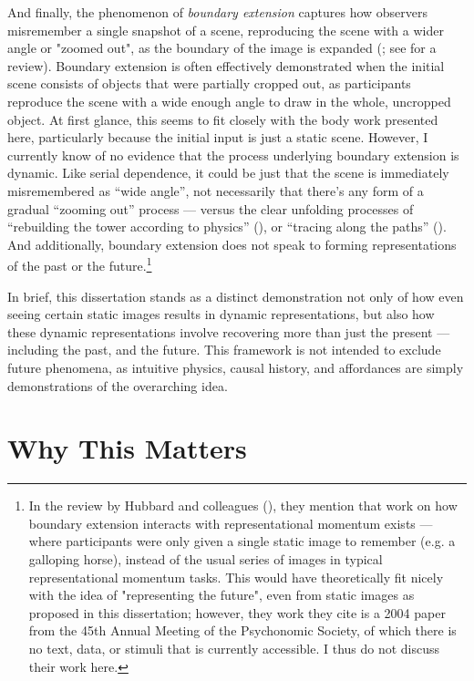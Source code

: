 And finally, the phenomenon of \textit{boundary extension} captures how observers misremember a single snapshot of a scene, reproducing the scene with a wider angle or "zoomed out", as the boundary of the image is expanded (\cite{intraub_wide-angle_1989}; see \cite{hubbard_boundary_2010} for a review). Boundary  extension is often effectively demonstrated when the initial scene consists of objects that were partially cropped out, as participants reproduce the scene with a wide enough angle to draw in the whole, uncropped object.  At first glance, this seems to fit closely with the body work presented here, particularly because the initial input is just a static scene.  However, I currently know of no evidence that the process underlying boundary extension is dynamic.  Like serial dependence, it could be just that the scene is immediately misremembered as “wide angle”, not necessarily that there’s any form of a gradual “zooming out” process --- versus the clear unfolding processes of “rebuilding the tower according to physics” (), or “tracing along the paths” ().  And additionally, boundary extension does not speak to forming representations of the past or the future.\footnote{In the review by Hubbard and colleagues (\citeyear{hubbard_boundary_2010}), they mention that work on how boundary extension interacts with representational momentum exists --- where participants were only given a single static image to remember (e.g. a galloping horse), instead of the usual series of images in typical representational momentum tasks.  This would have theoretically fit nicely with the idea of "representing the future", even from static images as proposed in this dissertation; however, they work they cite is a 2004 paper from the 45th Annual Meeting of the Psychonomic Society, of which there is no text, data, or stimuli that is currently accessible. I thus do not discuss their work here.}

In brief, this dissertation stands as a distinct demonstration not only of how even seeing certain static images results in dynamic representations, but also how these dynamic representations involve recovering more than just the present --- including the past, and the future. This framework is not intended to exclude future phenomena, as intuitive physics, causal history, and affordances are simply demonstrations of the overarching idea.


\section{Why This Matters}

